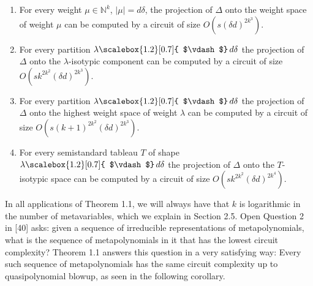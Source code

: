 \begin{enumerate}


\item 
 


For every weight $\mu\in\mathbb{N}^{k}$, $|\mu|=d\delta$, the projection of $\Delta$ onto the weight space of weight $\mu$ can be computed by a circuit of size $O(s(\delta d)^{2k^{3}})$.





\item 
 


For every partition $\lambda\mathchoice{\scalebox{1.2}[0.7]{ $\vdash$}\,}{\scalebox{1.2}[0.7]{ $\vdash$}\,}{\scalebox{0.7}{\scalebox{1.2}[0.7]{$\vdash$}}\,}{\scalebox{0.5}{\scalebox{1.2}[0.7]{$\vdash$}}\,}d\delta$ the projection of $\Delta$ onto the $\lambda$-isotypic component can be computed by a circuit of size $O(sk^{2k^{2}}(\delta d)^{2k^{3}})$.





\item 
 


For every partition $\lambda\mathchoice{\scalebox{1.2}[0.7]{ $\vdash$}\,}{\scalebox{1.2}[0.7]{ $\vdash$}\,}{\scalebox{0.7}{\scalebox{1.2}[0.7]{$\vdash$}}\,}{\scalebox{0.5}{\scalebox{1.2}[0.7]{$\vdash$}}\,}d\delta$ the projection of $\Delta$ onto the highest weight space of weight $\lambda$ can be computed by a circuit of size $O(s(k+1)^{2k^{2}}(\delta d)^{2k^{3}})$.





\item 
 


For every semistandard tableau $T$ of shape $\lambda\mathchoice{\scalebox{1.2}[0.7]{ $\vdash$}\,}{\scalebox{1.2}[0.7]{ $\vdash$}\,}{\scalebox{0.7}{\scalebox{1.2}[0.7]{$\vdash$}}\,}{\scalebox{0.5}{\scalebox{1.2}[0.7]{$\vdash$}}\,}d\delta$ the projection of $\Delta$ onto the $T$-isotypic space can be computed by a circuit of size $O(sk^{2k^{2}}(\delta d)^{2k^{4}})$.





\end{enumerate}





In all applications of
Theorem 1.1,
we will always have that $k$ is logarithmic in the number of metavariables, which we explain in Section 2.5.
Open Question 2 in [40] asks: given a sequence of irreducible representations of metapolynomials, what is the sequence of metapolynomials in it that has the lowest circuit complexity? Theorem 1.1 answers this question in a very satisfying way: Every such sequence of metapolynomials has the same circuit complexity up to quasipolynomial blowup, as seen in the following corollary.





